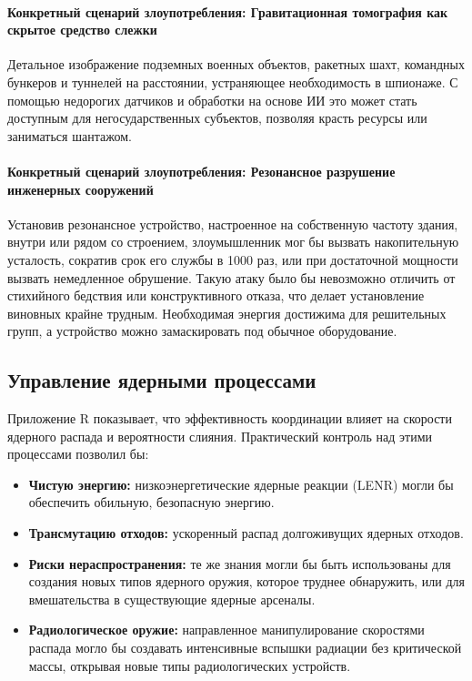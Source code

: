 \documentclass[12pt,a4paper]{article}
\theoremstyle{remark}
\begin{document}
	\paragraph{Конкретный сценарий злоупотребления: Гравитационная томография как скрытое средство слежки}
	Детальное изображение подземных военных объектов, ракетных шахт, командных бункеров и туннелей на расстоянии, устраняющее необходимость в шпионаже. С помощью недорогих датчиков и обработки на основе ИИ это может стать доступным для негосударственных субъектов, позволяя красть ресурсы или заниматься шантажом.
	
	\paragraph{Конкретный сценарий злоупотребления: Резонансное разрушение инженерных сооружений}
	Установив резонансное устройство, настроенное на собственную частоту здания, внутри или рядом со строением, злоумышленник мог бы вызвать накопительную усталость, сократив срок его службы в 1000 раз, или при достаточной мощности вызвать немедленное обрушение. Такую атаку было бы невозможно отличить от стихийного бедствия или конструктивного отказа, что делает установление виновных крайне трудным. Необходимая энергия достижима для решительных групп, а устройство можно замаскировать под обычное оборудование.
	
	\subsection{Управление ядерными процессами}
	\label{subsec:nuclear}
	
	Приложение R показывает, что эффективность координации влияет на скорости ядерного распада и вероятности слияния. Практический контроль над этими процессами позволил бы:
	\begin{itemize}[leftmargin=*]
		\item \textbf{Чистую энергию:} низкоэнергетические ядерные реакции (LENR) могли бы обеспечить обильную, безопасную энергию.
		\item \textbf{Трансмутацию отходов:} ускоренный распад долгоживущих ядерных отходов.
		\item \textbf{Риски нераспространения:} те же знания могли бы быть использованы для создания новых типов ядерного оружия, которое труднее обнаружить, или для вмешательства в существующие ядерные арсеналы.
		\item \textbf{Радиологическое оружие:} направленное манипулирование скоростями распада могло бы создавать интенсивные вспышки радиации без критической массы, открывая новые типы радиологических устройств.
	\end{itemize}
	
\end{document}
